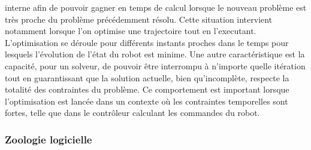 interne afin de pouvoir gagner en temps de calcul lorsque le nouveau
problème est très proche du problème précédemment résolu. Cette
situation intervient notamment lorsque l'on optimise une trajectoire
tout en l'executant. L'optimisation se déroule pour différents
instants proches dans le temps pour lesquels l'évolution de l'état du
robot est minime. Une autre caractéristique est la capacité, pour un
solveur, de pouvoir être interrompu à n'importe quelle itération tout
en guarantissant que la solution actuelle, bien qu'incomplète,
respecte la totalité des contraintes du problème. Ce comportement est
important lorsque l'optimisation est lancée dans un contexte où les
contraintes temporelles sont fortes, telle que dans le contrôleur
calculant les commandes du robot.



\subsubsection{Zoologie logicielle}


